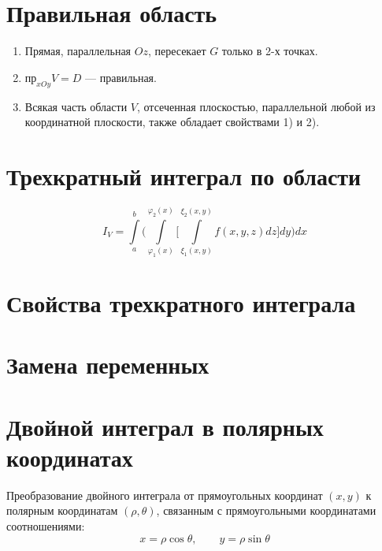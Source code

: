 \documentclass[a4paper,12pt,oneside]{extbook}
\theoremstyle{numbered}
\theoremstyle{unnumbered}
\theoremstyle{named}
\theoremstyle{unnumbered}
\theoremstyle{named}
\theoremstyle{named}
\theoremstyle{named}
\begin{document}
\section{Правильная область}
\label{sec:Правильная область}

\begin{enumerate}
    \item Прямая, параллельная \(Oz\), пересекает \(G\) только в 2-х точках.
    \item \(\text{пр}_{xOy} V = D\) — правильная.
    \item Всякая часть области \(V\), отсеченная плоскостью, параллельной любой из координатной плоскости, также обладает свойствами 1) и 2).
\end{enumerate}

\section{Трехкратный интеграл по области}
\label{sec:Трехкратный интеграл по области}

\begin{equation}
    I_V = \int\limits_{a}^{b} \Big( \int\limits_{\varphi_1(x)}^{\varphi_2(x)} \Big[ \int\limits_{\xi_1(x, y)}^{\xi_2(x, y)} f(x, y, z) dz \Big] dy \Big) dx
\end{equation}

\section{Свойства трехкратного интеграла}
\label{sec:Свойства трехкратного интеграла}


\section{Замена переменных}
\label{sec:Замена переменных}


\section{Двойной интеграл в полярных координатах}
\label{sec:Двойной интеграл в полярных координатах}

Преобразование двойного интеграла от прямоугольных координат \((x, y)\) к полярным координатам \((\rho, \theta)\), связанным с прямоугольными координатами соотношениями:
\begin{equation}
    x = \rho \cos{\theta}, \qquad y = \rho \sin{\theta}
\end{equation}
\end{document}
